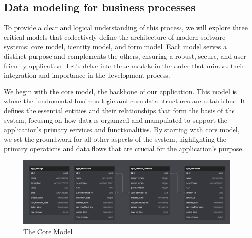 \subsection{Data modeling for business processes}
To provide a clear and logical understanding of this process, we will explore
three critical models that collectively define the architecture of modern
software systems: core model, identity model, and form model. Each model serves
a distinct purpose and complements the others, ensuring a robust, secure, and
user-friendly application. Let's delve into these models in the order that
mirrors their integration and importance in the development process.

We begin with the core model, the backbone of our application. This model is
where the fundamental business logic and core data structures are established.
It defines the essential entities and their relationships that form the basis of
the system, focusing on how data is organized and manipulated to support the
application’s primary services and functionalities. By starting with core model,
we set the groundwork for all other aspects of the system, highlighting the
primary operations and data flows that are crucial for the application's
purpose.
\begin{figure}[H]
  \centering
  \includegraphics[width=\linewidth]{Images/model_core.png}
  \vspace{1em}
  \caption{The Core Model}
\end{figure}

